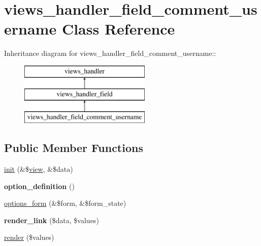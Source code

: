 \hypertarget{classviews__handler__field__comment__username}{
\section{views\_\-handler\_\-field\_\-comment\_\-username Class Reference}
\label{classviews__handler__field__comment__username}
}
Inheritance diagram for views\_\-handler\_\-field\_\-comment\_\-username::\begin{figure}[H]
\begin{center}
\leavevmode
\includegraphics[height=3cm]{classviews__handler__field__comment__username}
\end{center}
\end{figure}
\subsection*{Public Member Functions}
\begin{DoxyCompactItemize}
\item 
\hyperlink{classviews__handler__field__comment__username_a675e72d8f097a5d645459fab6943bac6}{init} (\&\$\hyperlink{classview}{view}, \&\$data)
\item 
\hypertarget{classviews__handler__field__comment__username_a6a9ac27498f1ddce0a8d680d6d33b7c5}{
{\bfseries option\_\-definition} ()}
\label{classviews__handler__field__comment__username_a6a9ac27498f1ddce0a8d680d6d33b7c5}

\item 
\hyperlink{classviews__handler__field__comment__username_a9bcc4bbe9ebbd7247431cfc18c5bab9c}{options\_\-form} (\&\$form, \&\$form\_\-state)
\item 
\hypertarget{classviews__handler__field__comment__username_aad13433240454bc6a94b4c0bda311f78}{
{\bfseries render\_\-link} (\$data, \$values)}
\label{classviews__handler__field__comment__username_aad13433240454bc6a94b4c0bda311f78}

\item 
\hyperlink{classviews__handler__field__comment__username_acbef770bc32e839510f616413fd83493}{render} (\$values)
\end{DoxyCompactItemize}


